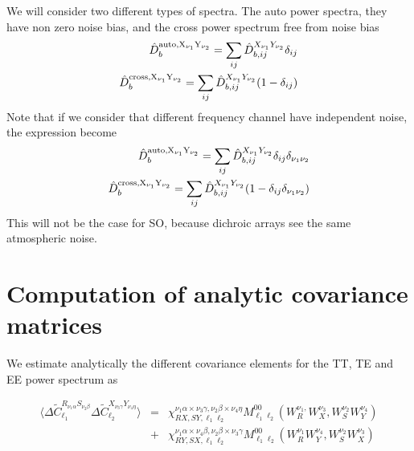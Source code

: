 \documentclass[a4paper, 11pt]{article}
\def\ba{\begin{eqnarray}}
\def\ea{\end{eqnarray}}
\begin{document}
We will consider two different types of spectra. The auto power spectra, they have non zero noise bias, and the cross power spectrum free from noise bias
\ba
\hat{D}^{\rm auto, X_{\nu_{1}}Y_{\nu_{2}}}_{b} = \sum_{ij}  \hat{D}^{X_{\nu_{1}}Y_{\nu_{2}}}_{b, ij} \delta_{ij} \\
\hat{D}^{\rm cross, X_{\nu_{1}}Y_{\nu_{2}}}_{b} = \sum_{ij}  \hat{D}^{X_{\nu_{1}}Y_{\nu_{2}}}_{b, ij} (1- \delta_{ij})
\ea
Note that if we consider that different frequency channel have independent noise, the expression become
\ba
\hat{D}^{\rm auto, X_{\nu_{1}}Y_{\nu_{2}}}_{b} = \sum_{ij}  \hat{D}^{X_{\nu_{1}}Y_{\nu_{2}}}_{b, ij} \delta_{ij} \delta_{\nu_{1} \nu_{2}}\\
\hat{D}^{\rm cross, X_{\nu_{1}}Y_{\nu_{2}}}_{b} = \sum_{ij}  \hat{D}^{X_{\nu_{1}}Y_{\nu_{2}}}_{b, ij} (1- \delta_{ij} \delta_{\nu_{1} \nu_{2}})
\ea
This will not be the case for SO, because dichroic arrays see the same atmospheric noise.


\section{Computation of analytic covariance matrices}




We estimate analytically the different covariance elements for the TT, TE and EE power spectrum as

\ba
\langle \Delta \tilde{C}^{R_{\nu_{1} \alpha}S_{\nu_{2} \beta}}_{\ell_{1}} \Delta  \tilde{C}^{X_{\nu_{3} \gamma}Y_{\nu_{4} \eta}}_{\ell_{2}}\rangle &=&      \chi_{RX,SY,\ell_{1}\ell_{2}}^{\nu_{1} \alpha \times \nu_{3} \gamma, \nu_{2} \beta \times  \nu_{4} \eta} M^{00}_{\ell_{1} \ell_{2}}(W_{R}^{\nu_{1}, } W_{X}^{\nu_{3}},W_{S}^{ \nu_{2} }W_{Y}^{ \nu_{4} })\nonumber \\
& +&  \chi_{RY,SX,\ell_{1}\ell_{2}}^{\nu_{1} \alpha \times \nu_{4} \beta, \nu_{2} \beta \times  \nu_{3} \gamma}  M^{00}_{\ell_{1} \ell_{2}}(W_{R}^{\nu_{1}}W_{Y}^{ \nu_{4} },W_{S}^{ \nu_{2} }W_{X}^{\nu_{3}})
\ea
\end{document}
